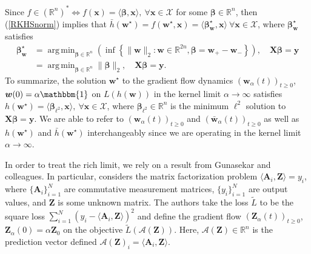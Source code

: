 \documentclass{article}
\DeclareMathOperator*{\argmin}{arg\,min}
\begin{document}
Since $f \in (\mathbb{R}^n)^* \Leftrightarrow f(\boldsymbol{x}) = \langle \boldsymbol{\beta}, \boldsymbol{x} \rangle, \ \forall \boldsymbol{x} \in \mathcal{X}$ for some $\boldsymbol{\beta} \in \mathbb{R}^n$, then (\ref{RKHSnorm}) implies that $\bar{h}(\boldsymbol{w}^{\star}) = f(\boldsymbol{w}^{\star}, \boldsymbol{x}) =  \langle \boldsymbol{\beta}_{\boldsymbol{w}}^{\star}, \boldsymbol{x} \rangle \ \forall \boldsymbol{x} \in \mathcal{X}$, where $\boldsymbol{\beta}_{\boldsymbol{w}}^{\star}$ satisfies
\begin{align*}
    \boldsymbol{\beta}_{\boldsymbol{w}}^{\star} &= \argmin_{\boldsymbol{\beta} \in \mathbb{R}^n} \left( \inf \left\{ \| \boldsymbol{w} \|_2 : \boldsymbol{w} \in \mathbb{R}^{2n},  \boldsymbol{\beta} = \boldsymbol{w}_+ - \boldsymbol{w}_- \right\}\right), \quad \boldsymbol{X}\boldsymbol{\beta} = \boldsymbol{y}\\
    &= \argmin_{\boldsymbol{\beta} \in \mathbb{R}^n} \| \boldsymbol{\beta} \|_2, \quad \boldsymbol{X}\boldsymbol{\beta} = \boldsymbol{y}.
\end{align*}
To summarize, the solution $\boldsymbol{w}^{\star}$ to the gradient flow dynamics $(\boldsymbol{w}_{\alpha}(t))_{t \geq 0}$, $\boldsymbol{w}(0) = \alpha \mathbbm{1}$ on $L(h(\boldsymbol{w}))$ in the kernel limit $\alpha \rightarrow \infty$ satisfies $h(\boldsymbol{w}^{\star}) =\langle \boldsymbol{\beta}_{\ell^2}, \boldsymbol{x} \rangle, \ \forall \boldsymbol{x} \in \mathcal{X}$, where $\boldsymbol{\beta}_{\ell^2} \in \mathbb{R}^n$ is the minimum $\ell^2$ solution to $\boldsymbol{X} \boldsymbol{\beta} = \boldsymbol{y}$. We are able to refer to $(\boldsymbol{w}_{\alpha}(t))_{t \geq 0}$ and $(\boldsymbol{\bar{w}}_{\alpha}(t))_{t \geq 0}$ as well as $h(\boldsymbol{w}^{\star})$ and $\bar{h}(\boldsymbol{w}^{\star})$ interchangeably since we are operating in the kernel limit $\alpha \rightarrow \infty$.

In order to treat the rich limit, we rely on a result from Gunasekar and colleagues. In particular, \cite{gunasekar2018implicit} considers the matrix factorization problem $\langle \boldsymbol{A}_i, \boldsymbol{Z} \rangle = y_i$, where $\{ \boldsymbol{A}_i \}_{i=1}^N$ are commutative measurement matrices, $\{ y_i \}_{i=1}^N$ are output values, and $\boldsymbol{Z}$ is some unknown matrix. The authors take the loss $\tilde{L}$  to be the square loss $\sum_{i=1}^N (y_i - \langle \boldsymbol{A}_i, \boldsymbol{Z} \rangle)^2$ and define the gradient flow $(\boldsymbol{Z}_{\alpha}(t))_{t \geq 0}$, $\boldsymbol{Z}_{\alpha}(0) = \alpha \boldsymbol{Z}_0$ on the objective $\tilde{L}(\mathcal{A}(\boldsymbol{Z}))$. Here, $\mathcal{A}(\boldsymbol{Z}) \in \mathbb{R}^n$ is the prediction vector defined $\mathcal{A}(\boldsymbol{Z})_i = \langle \boldsymbol{A}_i, \boldsymbol{Z} \rangle$. 
\end{document}
